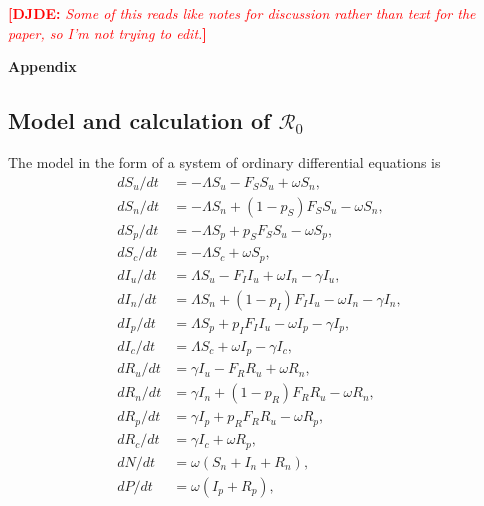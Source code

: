 \documentclass[12pt]{article}
\newcommand{\Rnum}{\mathcal{R}_0}
\newcommand{\comment}{\showcomment}
\newcommand{\showcomment}[3]{\textcolor{#1}{\textbf{[#2: }\textsl{#3}\textbf{]}}}
\newcommand{\david}[1]{\comment{red}{DJDE}{#1}}
\theoremstyle{definition} %
\begin{document}
\david{Some of this reads like notes for discussion rather than text for the paper, so I'm not trying to edit.}



\clearpage
\begin{center}
\textbf{\large Appendix}
\end{center}
\setcounter{equation}{0}
\setcounter{figure}{0}
\setcounter{table}{0}
\setcounter{page}{1}
\makeatletter
\renewcommand{\theequation}{A\arabic{equation}}
\renewcommand{\thefigure}{A\arabic{figure}}
\renewcommand{\bibnumfmt}[1]{[A#1]}
\renewcommand{\citenumfont}[1]{A#1}

\subsection{Model and calculation of $\Rnum$}

The model in the form of a system of ordinary differential equations is 
\begin{subequations}\label{model}
\begin{align}
 d S_u/dt &= -\Lambda S_u - F_S S_u + \omega S_n, \\
 d S_n/dt &= -\Lambda S_n + (1-p_S) F_S S_u - \omega S_n, \\
 d S_p/dt &= -\Lambda S_p + p_S F_S S_u - \omega S_p, \\
 d S_c/dt &= -\Lambda S_c + \omega S_p, \\
 d I_u/dt &= \Lambda S_u - F_I I_u + \omega I_n  - \gamma I_u, \\
 d I_n/dt &= \Lambda S_n + (1-p_I) F_I I_u - \omega I_n -\gamma I_n, \\
 d I_p/dt &= \Lambda S_p + p_I F_I I_u - \omega I_p -\gamma I_p, \\
 d I_c/dt &= \Lambda S_c + \omega I_p - \gamma I_c, \\
 d R_u/dt &= \gamma I_u - F_R R_u + \omega R_n, \\
 d R_n/dt &= \gamma I_n + (1-p_R) F_R R_u - \omega R_n, \\
 d R_p/dt &= \gamma I_p + p_R F_R R_u  - \omega R_p, \\
 d R_c/dt&= \gamma I_c + \omega R_p, \\
 dN/dt &= \omega (S_n + I_n + R_n),  \\
 dP/dt &= \omega(I_p + R_p) ,
\end{align}
\end{subequations}
\end{document}
